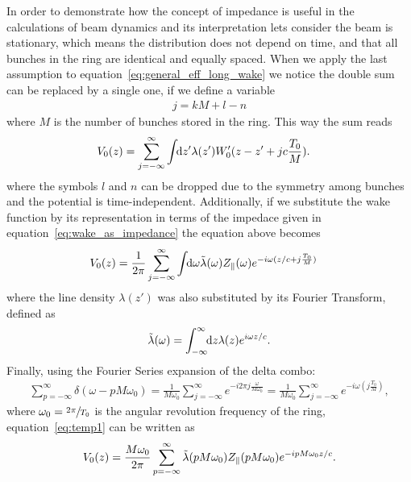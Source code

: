     In order to demonstrate how the concept of impedance is useful in the calculations of beam dynamics and its interpretation lets consider the beam is stationary, which means the distribution does not depend on time, and that all bunches in the ring are identical and equally spaced. When we apply the last assumption to equation~\eqref{eq:general_eff_long_wake} we notice the double sum can be replaced by a single one, if we define a variable
    \begin{align*}
    	  j = kM + l - n
    \end{align*}
    where $M$ is the number of bunches stored in the ring. This way the sum reads
    \begin{align}
	  	V_0(z) = \sum_{j=-\infty}^\infty\int\!\!\text{d}z' 
				&\lambda(z')W'_0(z-z' + jc\frac{T_0}{M}).
    \end{align}
    where the symbols $l$ and $n$ can be dropped due to the symmetry among bunches and the potential is time-independent. Additionally, if we substitute the wake function by its representation in terms of the impedace given in equation~\eqref{eq:wake_as_impedance} the equation above becomes
    \begin{align}\label{eq:temp1}
	   	V_0(z) = \frac{1}{2\pi}\sum_{j=-\infty}^\infty\int\!\!\text{d}\omega 
 				&\tilde{\lambda}(\omega)Z_\parallel(\omega)e^{-i\omega(z/c + j\frac{T_0}{M})}
    \end{align}
    where the line density $\lambda(z')$ was also substituted by its Fourier  Transform, defined as
    \begin{align}
  		\tilde{\lambda}(\omega) = \int_{-\infty}^{\infty}\!\!\text{d}z \lambda(z)e^{i\omega z/c}.
    \end{align}
    Finally, using the Fourier Series expansion of the delta combo:
    \begin{align}
  	  	\sum_{p=-\infty}^\infty \delta(\omega-pM\omega_0) =
	    	\frac{1}{M\omega_0} \sum_{j=-\infty}^\infty e^{-i2\pi j\frac{\omega}{M\omega_0}} =
	    	\frac{1}{M\omega_0} \sum_{j=-\infty}^\infty e^{-i\omega(j\frac{T_0}{M})},
    \end{align}
    where $\omega_0 = \sfrac{2\pi}{T_0}$ is the angular revolution frequency of the ring, equation~\eqref{eq:temp1} can be written as
    \begin{align}\label{eq:impedance_interpretation_long}
	  	V_0(z) = \frac{M\omega_0}{2\pi} \sum_{p=-\infty}^\infty \tilde{\lambda}(pM\omega_0)Z_\parallel(pM\omega_0)e^{-ipM\omega_0 z/c}.
    \end{align}
